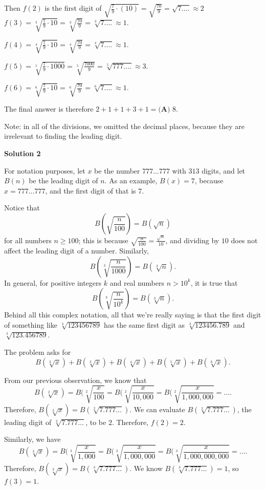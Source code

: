 \begin{enumerate}
 Then $f(2)$ is the first digit of $\sqrt{\frac{7}{9}\cdot(10)} = \sqrt{\frac{70}{9}} = \sqrt{7. \ldots} \approx 2$
$f(3) = \sqrt[3]{\frac{7}{9} \cdot 10} = \sqrt[3]{\frac{70}{9}} = \sqrt[3]{7.\ldots} \approx 1$.

 $f(4) = \sqrt[4]{\frac{7}{9} \cdot 10} = \sqrt[4]{\frac{70}{9}} = \sqrt[4]{7.\ldots} \approx 1$.

 $f(5) = \sqrt[5]{\frac{7}{9} \cdot 1000} = \sqrt[5]{\frac{7000}{9}} = \sqrt[5]{777.\ldots} \approx 3$.

 $f(6) = \sqrt[6]{\frac{7}{9} \cdot 10} = \sqrt[6]{\frac{70}{9}} = \sqrt[6]{7.\ldots} \approx 1$.

 The final answer is therefore $2+1+1+3+1 = \boxed{\textbf{(A) }8}$.

 Note: in all of the divisions, we omitted the decimal places, because they are irrelevant to finding the leading digit.

 



\textbf{Solution 2}

For notation purposes, let $x$ be the number $777 \ldots 777$ with $313$ digits, and let $B(n)$ be the leading digit of $n$. As an example, $B(x) = 7$, because $x = 777 \ldots 777$, and the first digit of that is $7$.

 Notice that 
 \[B(\sqrt{\frac{n}{100}}) = B(\sqrt{n})\] for all numbers $n \geq 100$; this is because $\sqrt{\frac{n}{100}} = \frac{\sqrt{n}}{10}$, and dividing by $10$ does not affect the leading digit of a number. Similarly, 
 \[B(\sqrt[3]{\frac{n}{1000}}) = B(\sqrt[3]{n}).\]In general, for positive integers $k$ and real numbers $n > 10^{k}$, it is true that
 \[B(\sqrt[k]{\frac{n}{10^{k}}}) = B(\sqrt[k]{n}).\]Behind all this complex notation, all that we're really saying is that the first digit of something like $\sqrt[3]{123456789}$ has the same first digit as $\sqrt[3]{123456.789}$ and $\sqrt[3]{123.456789}$.

 The problem asks for
 \[B(\sqrt[2]{x}) + B(\sqrt[3]{x}) + B(\sqrt[4]{x}) + B(\sqrt[5]{x}) + B(\sqrt[6]{x}).\]

 From our previous observation, we know that
 \[B(\sqrt[2]{x}) = B(\sqrt[2]{\frac{x}{100}} = B(\sqrt[2]{\frac{x}{10,000}} = B(\sqrt[2]{\frac{x}{1,000,000}} = \ldots .\] Therefore, $B(\sqrt[2]{x}) = B(\sqrt[2]{7.777 \dots})$. We can evaluate $B(\sqrt[2]{7.777 \dots})$, the leading digit of $\sqrt[2]{7.777 \dots}$, to be $2$. Therefore, $f(2) = 2$.

 Similarly, we have  
 \[B(\sqrt[3]{x}) = B(\sqrt[3]{\frac{x}{1,000}} = B(\sqrt[3]{\frac{x}{1,000,000}} = B(\sqrt[3]{\frac{x}{1,000,000,000}} = \ldots .\] Therefore, $B(\sqrt[3]{x}) = B(\sqrt[3]{7.777 \ldots})$. We know $B(\sqrt[3]{7.777 \ldots}) = 1$, so $f(3) = 1$.


\end{enumerate}
